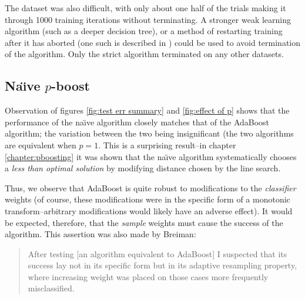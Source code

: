 The  dataset was also difficult, with only about one half of
the trials making it through 1000 training iterations without
terminating.  A stronger weak learning algorithm (such as a deeper
decision tree), or a method of restarting training after it has
aborted (one such is described in \cite{Bauer99}) could be used to 
avoid termination of the algorithm.  Only the strict algorithm
terminated on any other datasets.

\subsection{Na\"{\i}ve $p$-boost}

Observation of figures \ref{fig:test err summary} and \ref{fig:effect
of p} shows that the performance of the na\"{\i}ve algorithm closely
matches that of the AdaBoost algorithm; the variation between the two
being insignificant (the two algorithms are equivalent when $p = 1$.
This is a surprising result--in chapter \ref{chapter:pboosting} it was
shown that the na\"{\i}ve algorithm systematically chooses a
\emph{less than optimal solution} by modifying distance chosen by the
line search.

Thus, we observe that AdaBoost is quite robust to modifications to the
\emph{classifier} weights (of course, these modifications were in the
specific form of a monotonic transform--arbitrary modifications would
likely have an adverse effect).  It would be expected, therefore, that
the \emph{sample} weights must cause the success of the algorithm.
This assertion was also made by Breiman:

\begin{quotation}
After testing [an algorithm equivalent to AdaBoost] I suspected that
its success lay not in its specific form but in its adaptive
resampling property, where increasing weight was placed on those cases
more frequently misclassified.  \cite{Breiman96}
\end{quotation}

